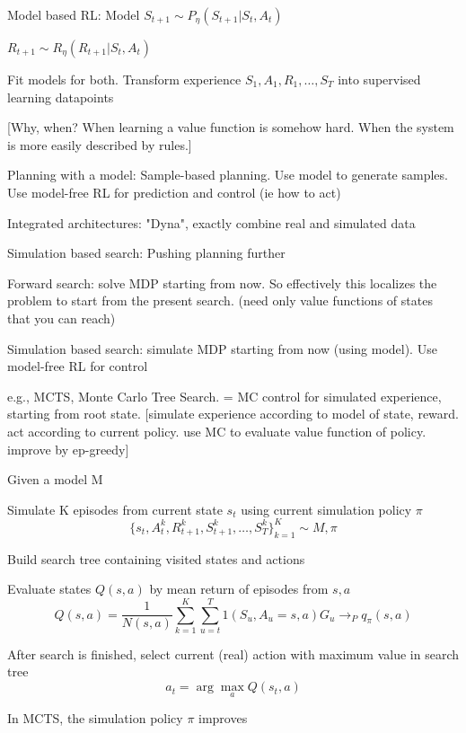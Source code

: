 \documentclass[english]{article}
\begin{document}
\item Model based RL: Model $S_{t+1}\sim P_\eta(S_{t+1}|S_t, A_t)$

$R_{t+1}\sim R_\eta(R_{t+1}|S_t, A_t)$

Fit models for both. Transform experience $S_1,A_1, R_1, \ldots, S_T$ into supervised learning datapoints

[Why, when? When learning a value function is somehow hard. When the system is more easily described by rules.]


\item Planning with a model: Sample-based planning. Use model to generate samples. Use model-free RL for prediction and control (ie how to act)

\item Integrated architectures: "Dyna", exactly combine real and simulated data

\item Simulation based search: Pushing planning further

Forward search: solve MDP starting from now. So effectively this localizes the problem to start from the present search. (need only value functions of states that you can reach)

Simulation based search: simulate MDP starting from now (using model). Use model-free RL for control

e.g., MCTS, Monte Carlo Tree Search. = MC control for simulated experience, starting from root state. [simulate experience according to model of state, reward. act according to current policy. use MC to evaluate value function of policy. improve by ep-greedy]

\benum
\item Given a model M
\item  Simulate K episodes from current state $s_t$ using current
simulation policy $\pi$
$$\{s_t ,A^k_t ,R^k_{t+1},S^k_{t+1},\ldots,S^k_{T}\}^K_{k=1}
\sim M,\pi$$
\item Build  search tree containing visited states and actions
\item Evaluate states $Q(s,a)$ by mean return of episodes from $s,a$
$$Q(s,a) =
\frac{1}
{N(s,a)}
\sum^K_{k=1}
\sum_{u=t}^T
1(S_u ,A_u = s,a)G_u
\to_P q_{\pi}(s,a)
$$

\item After search is finished, select current (real) action with
maximum value in search tree
$$a_t = \arg\max_a
Q(s_t ,a)$$
\eenum

In MCTS, the simulation policy $\pi$ improves
\end{document}
